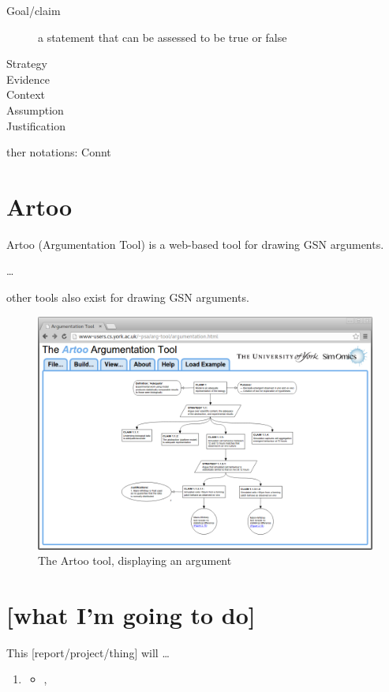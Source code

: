 \documentclass[authoryearcitations]{UoYCSproject}
\begin{document}
\begin{itemize*}
\begin{description}
  \item[Goal/claim]
  a statement that can be assessed to be true or false
  \item[Strategy]
  \item[Evidence]
  \item[Context]
  \item[Assumption]
  \item[Justification]
\end{description}

ther notations: Connt

\section{Artoo}

Artoo (Argumentation Tool) is a web-based tool for drawing GSN arguments.

\ldots

other tools also exist for drawing GSN arguments.

\begin{figure}
  \centering
  \includegraphics[width=\textwidth]{graphics/artoo_screenshot.png}
  \caption{The Artoo tool, displaying an argument }
\end{figure}

\section{[what I'm going to do]}

This [report/project/thing] will \ldots

  \begin{enumerate}
    \item \begin{itemize}
      \item ,
    \end{itemize}
  \end{enumerate}


\end{itemize*}
\end{document}
